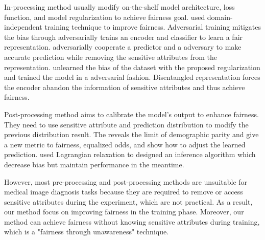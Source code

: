 In-processing method usually modify on-the-shelf model architecture, loss function, and model regularization to achieve fairness goal. \cite{Wang2020TowardsFI} used domain-independent training technique to improve fairness. Adversarial training mitigates the bias through adversarially trains an encoder and classifier to learn a fair representation. \cite{Zhang2018MitigatingUB} adversarially cooperate a predictor and a adversary to make accurate prediction while removing the sensitive attributes from the representation. \cite{kim2019learning} unlearned the bias of the dataset with the proposed regularization and trained the model in a adversarial fashion.
Disentangled representation forces the encoder abandon the information of sensitive attributes and thus achieve fairness.  

Post-processing method aims to calibrate the model's output to enhance fairness. They need to use sensitive attribute and prediction distribution to modify the previous distribution result. The \cite{Hardt2016EqualityOO} reveals the limit of demographic parity and give a new metric to fairness, equalized odds, and show how to adjust the learned prediction. \cite{Zhao2017MenAL} used Lagrangian relaxation to designed an inference algorithm which decrease bias but maintain performance in the meantime.



However, most pre-processing and post-processing methods are unsuitable for medical image diagnosis tasks because they are required to remove or access sensitive attributes during the experiment, which are not practical. As a result, our method focus on improving fairness in the training phase. Moreover, our method can achieve fairness without knowing sensitive attributes during training, which is a "fairness through unawareness" technique.